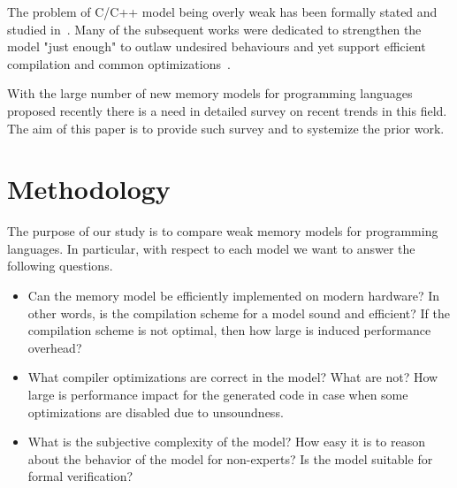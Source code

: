 \documentclass[a4paper,twoside,11pt]{article}
\numberwithin{equation}{section}
\begin{document}
The problem of C/C++ model being overly weak has 
been formally stated and studied in~\cite{Batty-al:ESOP15}.
Many of the subsequent works were dedicated 
to strengthen the model "just enough" to outlaw undesired behaviours
and yet support efficient compilation and 
common optimizations~\cite{Jeffrey-Riely:LICS16, PichonPharabod-Sewell:POPL16, 
Podkopaev-al:CoRR16, Kang-al:POPL17, Chakraborty-Vafeiadis:POPL19, Lee-el:PLDI20}. 

With the large number of new memory models for programming languages
proposed recently there is a need in detailed survey on recent trends in this field.
The aim of this paper is to provide such survey and to systemize the prior work.
 

\section{Methodology}

The purpose of our study is to compare weak memory models for programming languages.
In particular, with respect to each model we want to answer the following questions.


\begin{itemize}
  
  \item Can the memory model be efficiently implemented on modern hardware? 
    In other words, is the compilation scheme for a model sound and efficient?
    If the compilation scheme is not optimal, then how large is induced performance overhead?

  \item What compiler optimizations are correct in the model? What are not? 
    How large is performance impact for the generated code in case when 
    some optimizations are disabled due to unsoundness.

  \item What is the subjective complexity of the model?
    How easy it is to reason about the behavior of the model for non-experts?
    Is the model suitable for formal verification?
  
\end{itemize}
\end{document}

